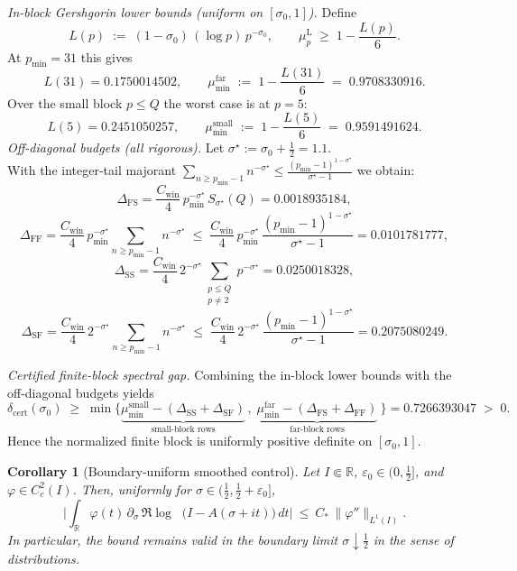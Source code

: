 \documentclass[11pt]{article}
\newtheorem{corollary}[theorem]{Corollary}
\theoremstyle{definition}
\theoremstyle{remark}
\newcommand{\R}{\mathbb{R}}
\DeclareMathOperator{\dettwo}{det_2}
\begin{document}
\noindent\emph{In-block Gershgorin lower bounds (uniform on \([\sigma_0,1]\)).}
Define
\[
L(p)\;:=\;(1-\sigma_0)\,(\log p)\,p^{-\sigma_0},\qquad 
\mu_p^{\mathrm L}\;\ge\;1-\frac{L(p)}{6}.
\]
At \(p_{\min}=31\) this gives
\[
L(31)=0.1750014502,\qquad 
\mu_{\min}^{\mathrm{far}}\;:=\;1-\frac{L(31)}{6}\;=\;0.9708330916.
\]
Over the small block \(p\le Q\) the worst case is at \(p=5\):
\[
L(5)=0.2451050257,\qquad 
\mu_{\min}^{\mathrm{small}}\;:=\;1-\frac{L(5)}{6}\;=\;0.9591491624.
\]
\noindent\emph{Off-diagonal budgets (all rigorous).}
Let \(\sigma^\star:=\sigma_0+\tfrac12=1.1\).\\
With the integer-tail majorant \(\displaystyle \sum_{n\ge p_{\min}-1} n^{-\sigma^\star}\le
\frac{(p_{\min}-1)^{1-\sigma^\star}}{\sigma^\star-1}\)
we obtain:
\[
\Delta_{\mathrm{FS}}
=\frac{C_{\mathrm{win}}}{4}\,p_{\min}^{-\sigma^\star}\,S_{\sigma^\star}(Q)
=0.0018935184,
\]
\[
\Delta_{\mathrm{FF}}
=\frac{C_{\mathrm{win}}}{4}\,p_{\min}^{-\sigma^\star}\!
\sum_{n\ge p_{\min}-1}\! n^{-\sigma^\star}
\;\le\;\frac{C_{\mathrm{win}}}{4}\,p_{\min}^{-\sigma^\star}\,
\frac{(p_{\min}-1)^{1-\sigma^\star}}{\sigma^\star-1}
=0.0101781777,
\]
\[
\Delta_{\mathrm{SS}}
=\frac{C_{\mathrm{win}}}{4}\,2^{-\sigma^\star}
\!\sum_{\substack{p\le Q\\ p\neq 2}}\! p^{-\sigma^\star}
=0.0250018328,
\]
\[
\Delta_{\mathrm{SF}}
=\frac{C_{\mathrm{win}}}{4}\,2^{-\sigma^\star}\!
\sum_{n\ge p_{\min}-1}\! n^{-\sigma^\star}
\;\le\;\frac{C_{\mathrm{win}}}{4}\,2^{-\sigma^\star}\,
\frac{(p_{\min}-1)^{1-\sigma^\star}}{\sigma^\star-1}
=0.2075080249.
\]

\noindent\emph{Certified finite-block spectral gap.}
Combining the in-block lower bounds with the off-diagonal budgets yields
\[
\delta_{\mathrm{cert}}(\sigma_0)\;\ge\;
\min\Big\{
\underbrace{\mu_{\min}^{\mathrm{small}}-(\Delta_{\mathrm{SS}}+\Delta_{\mathrm{SF}})}_{\text{small-block rows}}\,,\;
\underbrace{\mu_{\min}^{\mathrm{far}}-(\Delta_{\mathrm{FS}}+\Delta_{\mathrm{FF}})}_{\text{far-block rows}}\
\Big\}
=0.7266393047\;>\;0.
\]
Hence the normalized finite block is uniformly positive definite on \([\sigma_0,1]\).

\begin{corollary}[Boundary-uniform smoothed control]\label{cor:det2-boundary}
Let $I\Subset\R$, $\varepsilon_0\in(0,\tfrac12]$, and $\varphi\in C_c^2(I)$. Then, uniformly for $\sigma\in(\tfrac12,\tfrac12+\varepsilon_0]$,
\[
  \Big|\int_{\R} \varphi(t)\,\partial_\sigma\,\Re\log\dettwo\big(I-A(\sigma+it)\big)\,dt\Big|\ \le\ C_*\,\|\varphi''\|_{L^1(I)}.
\]
In particular, the bound remains valid in the boundary limit $\sigma\downarrow \tfrac12$ in the sense of distributions.
\end{corollary}
\end{document}
